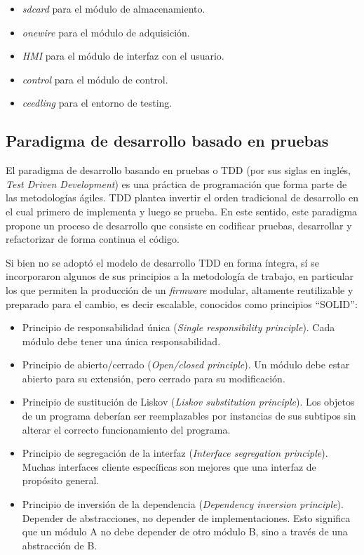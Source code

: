 \begin{itemize}
	\item \textit{sdcard} para el módulo de almacenamiento.
	\item \textit{onewire} para el módulo de adquisición.
	\item \textit{HMI} para el módulo de interfaz con el usuario.
	\item \textit{control} para el módulo de control.
	\item \textit{ceedling} para el entorno de testing.
\end{itemize}  

\subsection{Paradigma de desarrollo basado en pruebas}
\label{subsec:tdd}

El paradigma de desarrollo basando en pruebas o TDD (por sus siglas en inglés, \textit{Test Driven Development}) \citep{beck2003test} es una práctica de programación que forma parte de las metodologías ágiles.  TDD plantea invertir el orden tradicional de desarrollo en el cual primero de implementa y luego se prueba.  En este sentido, este paradigma propone un proceso de desarrollo que consiste en codificar pruebas, desarrollar y refactorizar de forma continua el código.

Si bien no se adoptó el modelo de desarrollo TDD en forma íntegra, sí se incorporaron algunos de sus principios a la metodología de trabajo, en particular los que permiten la producción de un \textit{firmware} modular, altamente reutilizable y preparado para el cambio, es decir escalable, conocidos como principios ``SOLID''\citep{martin2000design}:

\begin{itemize}
	\item Principio de responsabilidad única (\textit{Single responsibility principle}). Cada módulo debe tener una única responsabilidad.
	\item Principio de abierto/cerrado (\textit{Open/closed principle}). Un módulo debe estar abierto para su extensión, pero cerrado para su modificación.
	\item Principio de sustitución de Liskov (\textit{Liskov substitution principle}). Los objetos de un programa deberían ser reemplazables por instancias de sus subtipos sin alterar el correcto funcionamiento del programa.
	\item Principio de segregación de la interfaz (\textit{Interface segregation principle}). Muchas interfaces cliente específicas son mejores que una interfaz de propósito general.
	\item Principio de inversión de la dependencia (\textit{Dependency inversion principle}). Depender de abstracciones, no depender de implementaciones.  Esto significa que un módulo A no debe depender de otro módulo B, sino a través de una abstracción de B.
\end{itemize}

